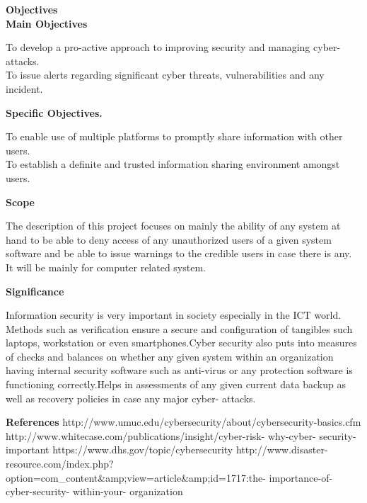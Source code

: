 \documentclass[10pt,a4paper]{report}
\begin{document}
\begin{flushleft}
	
	\textbf{Objectives}\\
	
\textbf{	Main Objectives}\linebreak[4]

	
	 To develop a pro-active approach to improving security and managing cyber-attacks.\\
		
		
		 To issue alerts regarding significant cyber threats, vulnerabilities and any incident.\linebreak[4]
		
	
	\textbf{Specific Objectives.}\linebreak[3]
	
	
	 To enable use of multiple platforms to promptly share information with other users.\\
		
		
		 To establish a definite and trusted information sharing environment amongst users.\linebreak[4]
	
	\textbf{Scope}
	
	The description of this project focuses on mainly the ability of any system at hand to be able to deny access of any unauthorized users of a given system software and be able to issue warnings to the credible users in case there is any. It will be mainly for computer related system.\linebreak[3]
	
	\textbf{Significance}
	
		Information security is very important in society especially in the ICT world. Methods such as verification ensure a secure and configuration of tangibles such laptops, workstation or even smartphones.\linebreak[3]
		Cyber security also puts into measures of checks and balances on whether any given system within an organization having internal security software such as anti-virus or any protection software is functioning correctly.\linebreak[3]
		Helps in assessments of any given current data backup as well as recovery policies in case any major cyber- attacks.\linebreak[7]
	
	
	
\textbf{{	References}}
	http://www.umuc.edu/cybersecurity/about/cybersecurity-basics.cfm
	http://www.whitecase.com/publications/insight/cyber-risk- why-cyber- security-important
	https://www.dhs.gov/topic/cybersecurity
	http://www.disaster-resource.com/index.php?option=com_content&amp;view=article&amp;id=1717:the- importance-of- cyber-security- within-your- organization
	
\end{flushleft}
	
	
\end{document}
